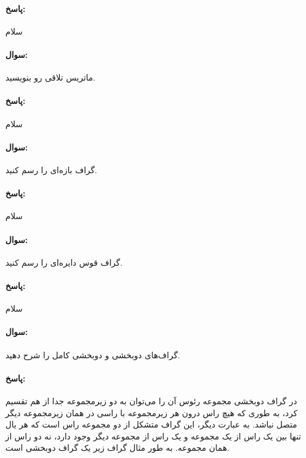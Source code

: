 \documentclass[a4paper,10pt]{article}
\begin{document}
    \paragraph{پاسخ:} سلام

    \noindent\hrulefill

    \paragraph{سوال:} ماتریس تلاقی رو بنویسید.

    \paragraph{پاسخ:} سلام

    \noindent\hrulefill

    \paragraph{سوال:} گراف بازه‌ای را رسم کنید.

    \paragraph{پاسخ:} سلام

    \noindent\hrulefill

    \paragraph{سوال:} گراف قوس دایره‌ای را رسم کنید.

    \paragraph{پاسخ:} سلام

    \noindent\hrulefill

    \paragraph{سوال:} گراف‌های دوبخشی و دوبخشی کامل را شرح دهید.

    \paragraph{پاسخ:} در گراف دوبخشی مجموعه رئوس آن را می‌توان به دو زیرمجموعه جدا از هم تقسیم کرد، به طوری که هیچ راس درون هر زیرمجموعه با راسی در همان زیرمجموعه دیگر متصل نباشد. به عبارت دیگر، این گراف متشکل از دو مجموعه راس است که هر یال تنها بین یک راس از یک مجموعه و یک راس از مجموعه دیگر وجود دارد، نه دو راس از همان مجموعه. به طور مثال گراف زیر یک گراف دوبخشی است.
\end{document}
